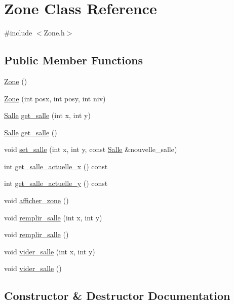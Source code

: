 \hypertarget{classZone}{}\section{Zone Class Reference}
\label{classZone}


{\ttfamily \#include $<$Zone.\+h$>$}

\subsection*{Public Member Functions}
\begin{DoxyCompactItemize}
\item 
\hyperlink{classZone_a37c9721c0d592a7a231f4e6dbae93277}{Zone} ()
\item 
\hyperlink{classZone_a47c33a8aad7a0c17ff8ab213aad492f7}{Zone} (int posx, int posy, int niv)
\item 
\hyperlink{classSalle}{Salle} \hyperlink{classZone_a6b28456d584e884cdeceaf6d4dcedbd1}{get\+\_\+salle} (int x, int y)
\item 
\hyperlink{classSalle}{Salle} \hyperlink{classZone_ab49f3b9677e9111970689cf26fa47b00}{get\+\_\+salle} ()
\item 
void \hyperlink{classZone_a5c68a620d5c32cd2bf26272aeaee557d}{set\+\_\+salle} (int x, int y, const \hyperlink{classSalle}{Salle} \&nouvelle\+\_\+salle)
\item 
int \hyperlink{classZone_a5cba037223549a19e4717c9a502895ca}{get\+\_\+salle\+\_\+actuelle\+\_\+x} () const 
\item 
int \hyperlink{classZone_a481d145df776bb245a223e6848b9a6d6}{get\+\_\+salle\+\_\+actuelle\+\_\+y} () const 
\item 
void \hyperlink{classZone_ae7fc481efb7e4bb2fc28bb5da0bbaf90}{afficher\+\_\+zone} ()
\item 
void \hyperlink{classZone_ae97ba3cc2a452803a66dbd3c0c84852b}{remplir\+\_\+salle} (int x, int y)
\item 
void \hyperlink{classZone_a76284023033d6b67f933b4656a8eb761}{remplir\+\_\+salle} ()
\item 
void \hyperlink{classZone_a296f45a66db2f5ad565d15274f628e72}{vider\+\_\+salle} (int x, int y)
\item 
void \hyperlink{classZone_a0f61f5c9028db56ef251371818b31b35}{vider\+\_\+salle} ()
\end{DoxyCompactItemize}


\subsection{Constructor \& Destructor Documentation}
